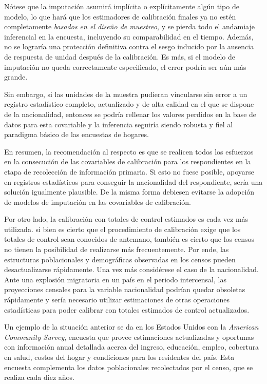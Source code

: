 \documentclass[
  12pt,
]{book}
\begin{document}
Nótese que la imputación asumirá implícita o explícitamente algún tipo de modelo, lo que hará que los estimadores de calibración finales ya no estén completamente \emph{basados en el diseño de muestreo}, y se pierda todo el andamiaje inferencial en la encuesta, incluyendo su comparabilidad en el tiempo. Además, no se lograría una protección definitiva contra el sesgo inducido por la ausencia de respuesta de unidad después de la calibración. Es más, si el modelo de imputación no queda correctamente especificado, el error podría ser aún más grande.

Sin embargo, si las unidades de la muestra pudieran vincularse sin error a un registro estadístico completo, actualizado y de alta calidad en el que se dispone de la nacionalidad, entonces se podría rellenar los valores perdidos en la base de datos para esta covariable y la inferencia seguiría siendo robusta y fiel al paradigma básico de las encuestas de hogares.

En resumen, la recomendación al respecto es que se realicen todos los esfuerzos en la consecución de las covariables de calibración para los respondientes en la etapa de recolección de información primaria. Si esto no fuese posible, apoyarse en registros estadísticos para conseguir la nacionalidad del respondiente, sería una solución igualmente plausible. De la misma forma debiesen evitarse la adopción de modelos de imputación en las covariables de calibración.

Por otro lado, la calibración con totales de control estimados es cada vez más utilizada. si bien es cierto que el procedimiento de calibración exige que los totales de control sean conocidos de antemano, también es cierto que los censos no tienen la posibilidad de realizarse más frecuentemente. Por ende, las estructuras poblacionales y demográficas observadas en los censos pueden desactualizarse rápidamente. Una vez más considérese el caso de la nacionalidad. Ante una explosión migratoria en un país en el periodo intercensal, las proyecciones censales para la variable nacionalidad podrían quedar obsoletas rápidamente y sería necesario utilizar estimaciones de otras operaciones estadísticas para poder calibrar con totales estimados de control actualizados.

Un ejemplo de la situación anterior se da en los Estados Unidos con la \emph{American Community Survey}, encuesta que provee estimaciones actualizadas y oportunas con información anual detallada acerca del ingreso, educación, empleo, cobertura en salud, costos del hogar y condiciones para los residentes del país. Esta encuesta complementa los datos poblacionales recolectados por el censo, que se realiza cada diez años.
\end{document}

